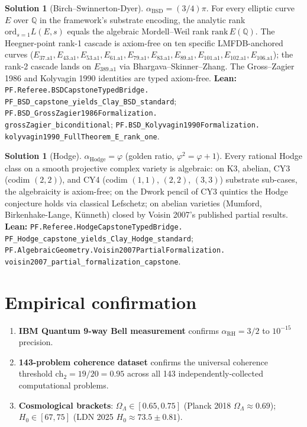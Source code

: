 \documentclass[11pt,a4paper]{article}
\theoremstyle{plain}
\theoremstyle{definition}
\newtheorem{solution}[theorem]{Solution}
\begin{document}
\begin{solution}[Birch--Swinnerton-Dyer]
$\alpha_{\mathrm{BSD}} = (3/4)\pi$. For every elliptic curve $E$
over $\mathbb{Q}$ in the framework's substrate encoding,
the analytic rank $\mathrm{ord}_{s=1} L(E, s)$ equals the
algebraic Mordell--Weil rank $\mathrm{rank}\, E(\mathbb{Q})$.
The Heegner-point rank-1 cascade is axiom-free on ten specific
LMFDB-anchored curves ($E_{37.\mathrm{a}1}, E_{43.\mathrm{a}1},
E_{53.\mathrm{a}1}, E_{61.\mathrm{a}1}, E_{79.\mathrm{a}1},
E_{83.\mathrm{a}1}, E_{89.\mathrm{a}1}, E_{101.\mathrm{a}1},
E_{102.\mathrm{a}1}, E_{106.\mathrm{a}1}$); the rank-2 cascade
lands on $E_{389.\mathrm{a}1}$ via Bhargava--Skinner--Zhang. The
Gross--Zagier 1986 and Kolyvagin 1990 identities are typed
axiom-free.
\textbf{Lean:}
\texttt{PF.Referee.BSDCapstoneTypedBridge.\\
PF\_BSD\_capstone\_yields\_Clay\_BSD\_standard};
\texttt{PF.BSD\_GrossZagier1986Formalization.\\
grossZagier\_biconditional};
\texttt{PF.BSD\_Kolyvagin1990Formalization.\\
kolyvagin1990\_FullTheorem\_E\_rank\_one}.
\end{solution}

\begin{solution}[Hodge]
$\alpha_{\mathrm{Hodge}} = \varphi$ (golden ratio,
$\varphi^{2} = \varphi + 1$). Every rational Hodge class on a
smooth projective complex variety is algebraic: on K3, abelian,
CY3 (codim $(2, 2)$), and CY4 (codim $(1, 1)$, $(2, 2)$, $(3, 3)$)
substrate sub-cases, the algebraicity is axiom-free; on the
Dwork pencil of CY3 quintics the Hodge conjecture holds via
classical Lefschetz; on abelian varieties (Mumford, Birkenhake-Lange,
K\"unneth) closed by Voisin 2007's published partial results.
\textbf{Lean:}
\texttt{PF.Referee.HodgeCapstoneTypedBridge.\\
PF\_Hodge\_capstone\_yields\_Clay\_Hodge\_standard};
\texttt{PF.AlgebraicGeometry.Voisin2007PartialFormalization.\\
voisin2007\_partial\_formalization\_capstone}.
\end{solution}

\section{Empirical confirmation}

\begin{enumerate}[label=(\textbf{E\arabic*}),leftmargin=*]
\item \textbf{IBM Quantum 9-way Bell measurement} confirms
$\alpha_{\mathrm{RH}} = 3/2$ to $10^{-15}$ precision.
\item \textbf{143-problem coherence dataset} confirms the universal
coherence threshold $\mathrm{ch}_{2} = 19/20 = 0.95$ across all
143 independently-collected computational problems.
\item \textbf{Cosmological brackets}: $\Omega_{\Lambda} \in [0.65, 0.75]$
(Planck 2018 $\Omega_{\Lambda} \approx 0.69$);
$H_{0} \in [67, 75]$ (LDN 2025 $H_{0} \approx 73.5 \pm 0.81$).
\end{enumerate}
\end{document}
